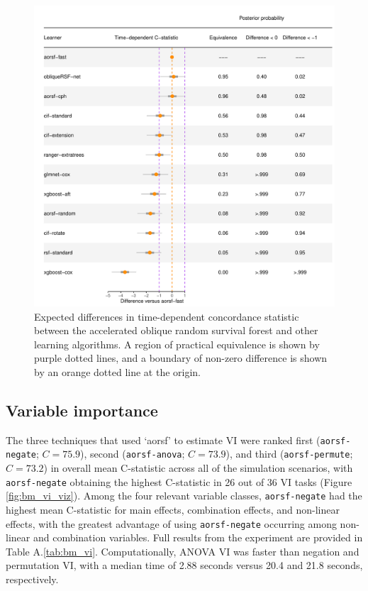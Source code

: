 \documentclass[12pt]{article}\usepackage[]{graphicx}\usepackage[]{xcolor}
\makeatletter
\def\maxwidth{ %
  \ifdim\Gin@nat@width>\linewidth
    \linewidth
  \else
    \Gin@nat@width
  \fi
}
\newenvironment{knitrout}{}{} %
\newcommand{\tabrefAppendix}[1]{Table A.\ref{#1}}
\makeatother
\begin{document}
\begin{knitrout}
\color{fgcolor}\begin{figure}
\includegraphics[width=\maxwidth]{figure/bm_pred_model_viz_cstat-1} \caption[Expected differences in time-dependent concordance statistic between the accelerated oblique random survival forest and other learning algorithms]{Expected differences in time-dependent concordance statistic between the accelerated oblique random survival forest and other learning algorithms. A region of practical equivalence is shown by purple dotted lines, and a boundary of non-zero difference is shown by an orange dotted line at the origin.}\label{fig:bm_pred_model_viz_cstat}
\end{figure}

\end{knitrout}

\subsection{Variable importance} \label{sec:results_vi}



The three techniques that used `aorsf' to estimate VI were ranked first (\texttt{aorsf-negate}; $C = 75.9$), second (\texttt{aorsf-anova}; $C = 73.9$), and third (\texttt{aorsf-permute}; $C = 73.2$) in overall mean C-statistic across all of the simulation scenarios, with \texttt{aorsf-negate} obtaining the highest C-statistic in 26 out of 36 VI tasks (Figure \ref{fig:bm_vi_viz}). Among the four relevant variable classes, \texttt{aorsf-negate} had the highest mean C-statistic for main effects, combination effects, and non-linear effects, with the greatest advantage of using \texttt{aorsf-negate} occurring among non-linear and combination variables. Full results from the experiment are provided in \tabrefAppendix{tab:bm_vi}. Computationally, ANOVA VI was faster than negation and permutation VI, with a median time of 2.88 seconds versus 20.4 and 21.8 seconds, respectively.
\end{document}
